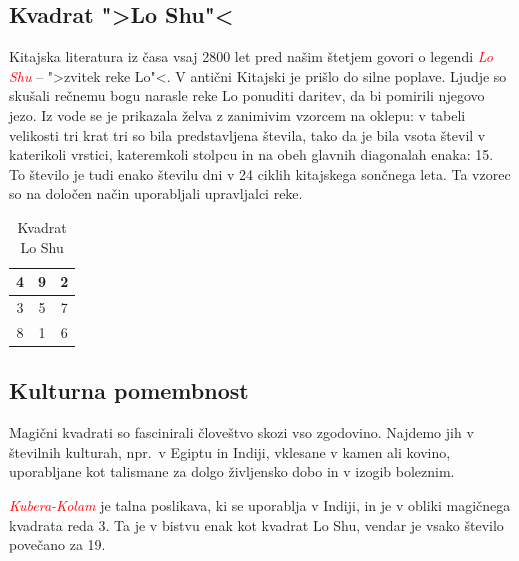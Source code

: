 \documentclass[a4paper,12pt]{article}
\theoremstyle{definition}
\begin{document}
\subsection{Kvadrat ">Lo Shu"<}

Kitajska literatura iz časa vsaj 2800 let pred našim štetjem govori o legendi
\textcolor{red}{\emph{Lo Shu}} -- ">zvitek reke Lo"<. V antični Kitajski je prišlo do
silne poplave. Ljudje so skušali rečnemu bogu narasle reke Lo ponuditi daritev,
da bi pomirili njegovo jezo. Iz vode se je prikazala želva z zanimivim vzorcem
na oklepu: v tabeli velikosti tri krat tri so bila predstavljena števila, tako
da je bila vsota števil v katerikoli vrstici, kateremkoli stolpcu in na obeh
glavnih diagonalah enaka: 15. To število je tudi enako številu dni v 24 ciklih
kitajskega sončnega leta. Ta vzorec so na določen način uporabljali upravljalci
reke.

\begin{table}[h!]
   \centering
   \caption{Kvadrat Lo Shu}
   \label{loshu}
   \begin{tabular}{|c|c|c|}
      \hline
      4 & 9 & 2 \\\hline
      3 & 5 & 7 \\\hline
      8 & 1 & 6 \\\hline
      \end{tabular}
\end{table}

\subsection{Kulturna pomembnost}

Magični kvadrati so fascinirali človeštvo skozi vso zgodovino. Najdemo jih
v številnih kulturah, npr.\ v Egiptu in Indiji, vklesane v kamen ali
kovino, uporabljane kot talismane za dolgo življensko dobo in v
izogib boleznim.

\textcolor{red}{\emph{Kubera-Kolam}} je talna poslikava, ki se uporablja v Indiji, in je v
obliki magičnega kvadrata reda 3. Ta je v bistvu enak kot kvadrat
Lo Shu, vendar je vsako število povečano za 19.
\end{document}
